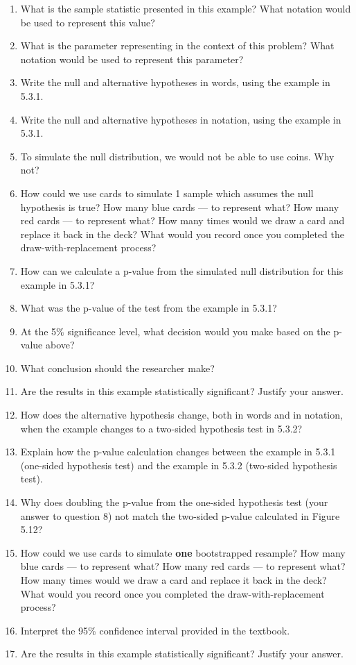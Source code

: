 \documentclass[
]{report}
\newcommand{\rgs}{\vspace{12pt}} %
\begin{document}
\begin{enumerate}
\def\labelenumi{\arabic{enumi}.}
\item
  What is the sample statistic presented in this example? What notation would be used to represent this value?
  \rgs
\item
  What is the parameter representing in the context of this problem? What notation would be used to represent this parameter?
  \rgs
  \rgs
\item
  Write the null and alternative hypotheses in words, using the example in 5.3.1.
  \rgs
  \rgs
\item
  Write the null and alternative hypotheses in notation, using the example in 5.3.1.
  \rgs
\item
  To simulate the null distribution, we would not be able to use coins. Why not?
  \rgs
  \rgs
\item
  How could we use cards to simulate 1 sample which assumes the null hypothesis is true? How many blue cards --- to represent what? How many red cards --- to represent what? How many times would we draw a card and replace it back in the deck? What would you record once you completed the draw-with-replacement process?
  \rgs
  \rgs
  \rgs
\item
  How can we calculate a p-value from the simulated null distribution for this example in 5.3.1?
  \rgs
  \rgs
\item
  What was the p-value of the test from the example in 5.3.1?
  \rgs
\item
  At the 5\% significance level, what decision would you make based on the p-value above?
  \rgs
\item
  What conclusion should the researcher make?
  \rgs
  \rgs
\item
  Are the results in this example statistically significant? Justify your answer.
  \rgs
  \rgs
\item
  How does the alternative hypothesis change, both in words and in notation, when the example changes to a two-sided hypothesis test in 5.3.2?\\
  \rgs
  \rgs
\item
  Explain how the p-value calculation changes between the example in 5.3.1 (one-sided hypothesis test) and the example in 5.3.2 (two-sided hypothesis test).
  \rgs
  \rgs
\item
  Why does doubling the p-value from the one-sided hypothesis test (your answer to question 8) not match the two-sided p-value calculated in Figure 5.12?
  \rgs
  \rgs
\item
  How could we use cards to simulate \textbf{one} bootstrapped resample? How many blue cards --- to represent what? How many red cards --- to represent what? How many times would we draw a card and replace it back in the deck? What would you record once you completed the draw-with-replacement process?
  \rgs
  \rgs
  \rgs
\item
  Interpret the 95\% confidence interval provided in the textbook.
  \rgs
  \rgs
\item
  Are the results in this example statistically significant? Justify your answer.
  \rgs
\end{enumerate}
\end{document}
